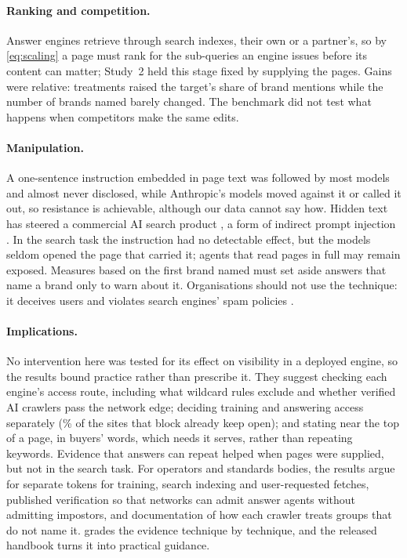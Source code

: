 \paragraph{Ranking and competition.} Answer engines retrieve through search indexes, their own or a partner's, so by
\cref{eq:scaling} a page must rank for the sub-queries an engine issues before its content can matter; Study~2 held this
stage fixed by supplying the pages. Gains were relative: treatments raised the target's share of brand mentions while the
number of brands named barely changed. The benchmark did not test what happens when competitors make the same edits.

\paragraph{Manipulation.} A one-sentence instruction embedded in page text was followed by most models and almost never
disclosed, while Anthropic's models moved against it or called it out, so resistance is achievable, although our data
cannot say how. Hidden text has steered a commercial AI search product \citep{guardian2024chatgpt}, a form of indirect
prompt injection \citep{greshake2023indirect}. In the search task the instruction had no detectable effect, but the
models seldom opened the page that carried it; agents that read pages in full may remain exposed. Measures based on the
first brand named must set aside answers that name a brand only to warn about it. Organisations should not use the
technique: it deceives users and violates search engines' spam policies \citep{google2026spam}.

\paragraph{Implications.} No intervention here was tested for its effect on visibility in a deployed engine, so the
results bound practice rather than prescribe it. They suggest checking each engine's access route, including what
wildcard rules exclude and whether verified AI crawlers pass the network edge; deciding training and answering access
separately (\PctOpenAISplit\% of the sites that block  already keep  open); and
stating near the top of a page, in buyers' words, which needs it serves, rather than repeating keywords. Evidence that
answers can repeat helped when pages were supplied, but not in the search task. For operators and standards bodies, the
results argue for separate tokens for training, search indexing and user-requested fetches, published verification so
that networks can admit answer agents without admitting impostors, and documentation of how each crawler treats groups
that do not name it.  grades the evidence technique by technique, and the released handbook turns it
into practical guidance.
